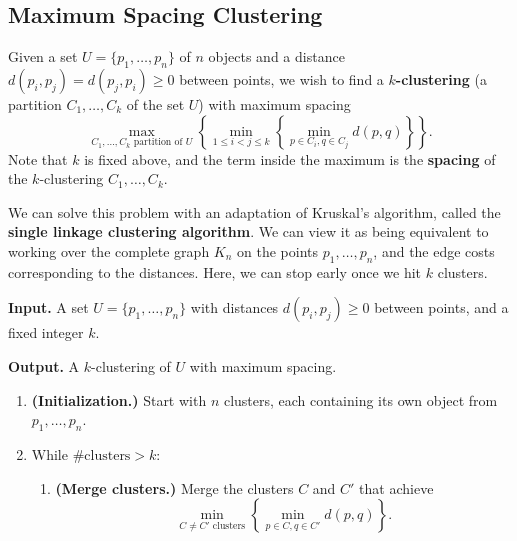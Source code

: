 \subsection{Maximum Spacing Clustering}\label{subsec:2.5}
Given a set $U = \{p_1, \dots, p_n\}$ of $n$ objects and a distance 
$d(p_i, p_j) = d(p_j, p_i) \geq 0$ between points, we wish to find a 
{\bf $k$-clustering} (a partition $C_1, \dots, C_k$ of the set $U$) with 
maximum spacing 
\[ \max_{C_1, \dots, C_k \text{ partition of } U} 
\left\{ \min_{1\leq i<j\leq k} \left\{ \min_{p\in C_i, q \in C_j} 
d(p, q) \right\} \right\}. \] 
Note that $k$ is fixed above, and the term inside the maximum is the 
{\bf spacing} of the $k$-clustering $C_1, \dots, C_k$.

We can solve this problem with an adaptation of Kruskal's algorithm, 
called the {\bf single linkage clustering algorithm}.
We can view it as being equivalent to working over the complete 
graph $K_n$ on the points $p_1, \dots, p_n$,
and the edge costs corresponding to the distances. Here,
we can stop early once we hit $k$ clusters.

\begin{mdframed}[
    linewidth=1pt,
    linecolor=black,
    bottomline=false,topline=false,rightline=false,
    innerrightmargin=0pt,innertopmargin=0pt,innerbottommargin=0pt,
    innerleftmargin=1em,%
    skipabove=0.75\baselineskip
]
{\bf Input.} A set $U = \{p_1, \dots, p_n\}$ with 
distances $d(p_i, p_j) \geq 0$ between points, and a fixed integer $k$.

{\bf Output.} A $k$-clustering of $U$ with maximum spacing.
\begin{enumerate}[leftmargin=1.75cm, label={Step \arabic*.}]
    \item {\bf (Initialization.)} Start with $n$ clusters, each containing 
    its own object from $p_1, \dots, p_n$. 

    \item While $\# \text{clusters} > k$:
    \begin{enumerate}[label={}]
        \item {\bf (Merge clusters.)} Merge the clusters $C$ and $C'$ 
        that achieve 
        \[ \min_{C\neq C' \text{ clusters}} \left\{ \min_{p\in C, q\in C'} 
        d(p, q) \right\}. \] 
    \end{enumerate}
\end{enumerate}
\end{mdframed}\vspace{-0.15cm}